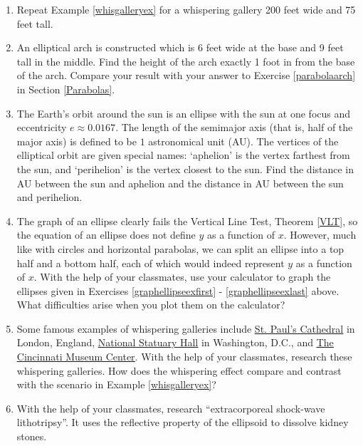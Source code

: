 \begin{enumerate}
\setcounter{enumi}{\value{HW}}

\item  Repeat Example \ref{whisgalleryex} for a whispering gallery 200 feet wide and 75 feet tall.

\item \label{ellipsearchex} An elliptical arch is constructed which is 6 feet wide at the base and 9 feet tall in the middle. Find the height of the arch exactly 1 foot in from the base of the arch. Compare your result with your answer to Exercise \ref{parabolaarch} in Section \ref{Parabolas}.

\item The Earth's orbit around the sun is an ellipse with the sun at one focus and eccentricity $e \approx 0.0167$.  The length of the semimajor axis (that is, half of the major axis) is defined to be $1$ astronomical unit (AU).  The vertices of the elliptical orbit are given special names: `aphelion' is the vertex farthest from the sun, and  `perihelion' is the vertex closest to the sun.  Find the distance in AU between the sun and aphelion and the distance in AU between the sun and perihelion.

\item The graph of an ellipse clearly fails the Vertical Line Test, Theorem \ref{VLT}, so the equation of an ellipse does not define $y$ as a function of $x$.  However, much like with circles and horizontal parabolas, we can split an  ellipse into a top half and a bottom half, each of which would indeed represent $y$ as a function of $x$.  With the help of your classmates, use your calculator to graph the ellipses given in Exercises \ref{graphellipseexfirst} - \ref{graphellipseexlast} above. What difficulties arise when you plot them on the calculator?

\item Some famous examples of whispering galleries include \href{http://www.stpauls.co.uk/}{\underline{St. Paul's Cathedral}} in London, England, \href{http://www.aoc.gov/cc/capitol/nat_stat_hall.cfm}{\underline{National Statuary Hall}} in Washington, D.C.,  and \href{http://www.cincymuseum.org/}{\underline{The Cincinnati Museum Center}}. With the help of your classmates, research these whispering galleries.  How does the whispering effect compare and contrast with the scenario in Example  \ref{whisgalleryex}?

\item With the help of your classmates, research ``extracorporeal shock-wave lithotripsy''.  It uses the reflective property of the ellipsoid to dissolve kidney stones.

\end{enumerate}

